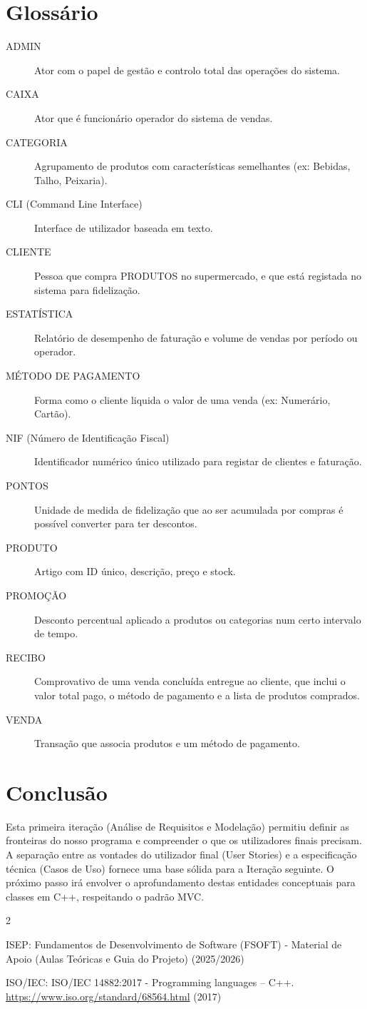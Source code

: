 \documentclass[a4paper]{llncs}
\begin{document}
\section{Glossário}
\begin{description}
    \item[ADMIN] Ator com o papel de gestão e controlo total das operações do sistema.
    \item[CAIXA] Ator que é funcionário operador do sistema de vendas.
    \item[CATEGORIA] Agrupamento de produtos com características semelhantes (ex: Bebidas, Talho, Peixaria).
    \item[CLI (Command Line Interface)] Interface de utilizador baseada em texto.
    \item[CLIENTE] Pessoa que compra PRODUTOS no supermercado, e que está registada no sistema para fidelização.
    \item[ESTATÍSTICA] Relatório de desempenho de faturação e volume de vendas por período ou operador.
    \item[MÉTODO DE PAGAMENTO] Forma como o cliente liquida o valor de uma venda (ex: Numerário, Cartão).
    \item[NIF (Número de Identificação Fiscal)] Identificador numérico único utilizado para registar de clientes e faturação.
    \item[PONTOS] Unidade de medida de fidelização que ao ser acumulada por compras é possível converter para ter descontos.
    \item[PRODUTO] Artigo com ID único, descrição, preço e stock.
    \item[PROMOÇÃO] Desconto percentual aplicado a produtos ou categorias num certo intervalo de tempo.
    \item[RECIBO] Comprovativo de uma venda concluída entregue ao cliente, que inclui o valor total pago, o método de pagamento e a lista de produtos comprados.
    \item[VENDA] Transação que associa produtos e um método de pagamento.
\end{description}

\section{Conclusão}
Esta primeira iteração (Análise de Requisitos e Modelação) permitiu definir as fronteiras do nosso programa e compreender o que os utilizadores finais precisam. A separação entre as vontades do utilizador final (User Stories) e a especificação técnica (Casos de Uso) fornece uma base sólida para a Iteração seguinte. O próximo passo irá envolver o aprofundamento destas entidades conceptuais para classes em C++, respeitando o padrão MVC.

\begin{thebibliography}{2}

ISEP: Fundamentos de Desenvolvimento de Software (FSOFT) - Material de Apoio (Aulas Teóricas e Guia do Projeto) (2025/2026)

ISO/IEC: ISO/IEC 14882:2017 - Programming languages -- C++. \url{https://www.iso.org/standard/68564.html} (2017)

\end{thebibliography}
\end{document}
